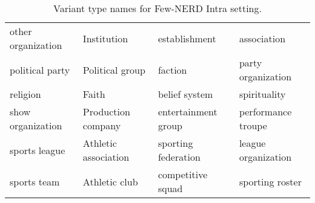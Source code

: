 \documentclass[11pt]{article}
\begin{document}
\begin{table*}[htb]
\begin{center}
{\begin{tabular}{llll}
    other organization                               & Institution                            & establishment                          & association                            \\
    political party                                  & Political group                        & faction                                & party organization                     \\
    religion                                         & Faith                                  & belief system                          & spirituality                           \\
    show organization                                & Production company                     & entertainment group                    & performance troupe                     \\
    sports league                                    & Athletic association                   & sporting federation                    & league organization                    \\
    sports team                                      & Athletic club                          & competitive squad                      & sporting roster                        \\
    \bottomrule
    \end{tabular}
    }
\end{center}
\caption{Variant type names for Few-NERD Intra setting.}
\label{app:tab:variant_types_fewnerd}
\end{table*}
\end{document}
